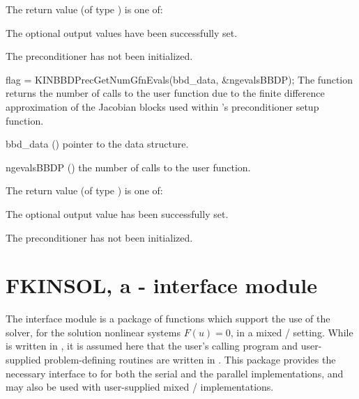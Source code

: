 {
  The return value  (of type ) is one of:
  \begin{args}
  \item[\Id{KIN\_SUCCESS}] 
    The optional output values have been successfully set.
  \item[\Id{KIN\_PDATA\_NULL}]
    The {\kinbbdpre} preconditioner has not been initialized.
  \end{args}
}
{}
{
  flag = KINBBDPrecGetNumGfnEvals(bbd\_data, \&ngevalsBBDP);
}
{
  The function  returns the
  number of calls to the user  function due to the 
  finite difference approximation of the Jacobian blocks used within
  {\kinbbdpre}'s preconditioner setup function.
}
{
  \begin{args}[ngevalsBBDP]
  \item[bbd\_data] ()
    pointer to the {\kinbbdpre} data structure.
  \item[ngevalsBBDP] ()
    the number of calls to the user  function.
  \end{args}
}
{
  The return value  (of type ) is one of:
  \begin{args}
  \item[\Id{KIN\_SUCCESS}] 
    The optional output value has been successfully set.
  \item[\Id{KIN\_PDATA\_NULL}]
    The {\kinbbdpre} preconditioner has not been initialized.
  \end{args}
}
{}


\section{FKINSOL, a {\F}-{\C} interface module}\label{ss:fcmix}

The {\fkinsol} interface module is a package of {\C} functions which support
the use of the {\kinsol} solver, for the solution nonlinear systems
$F(u)=0$, in a mixed {\F}/{\C} setting.  While {\kinsol} is written
in {\C}, it is assumed here that the user's calling program and
user-supplied problem-defining routines are written in {\F}.
This package provides the necessary interface to {\kinsol} for both the
serial and the parallel {\nvector} implementations, and may also be
used with user-supplied mixed {\F}/{\C} {\nvector} implementations.

